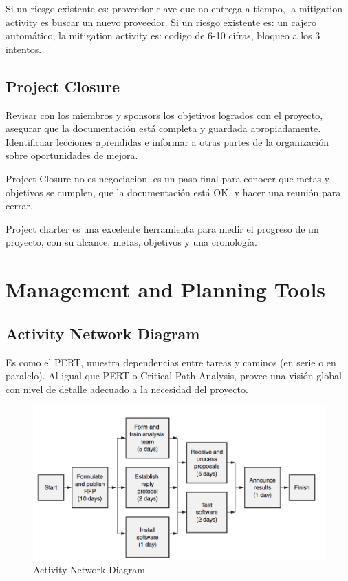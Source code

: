 \documentclass[]{article}
\begin{document}
Si un riesgo existente es: proveedor clave que no entrega a tiempo, la mitigation activity es buscar un nuevo proveedor.
Si un riesgo existente es: un cajero automático, la mitigation activity es: codigo de 6-10 cifras, bloqueo a los 3 intentos.

\subsection{Project Closure}

Revisar con los miembros y sponsors los objetivos logrados con el proyecto, asegurar que la documentación está completa y guardada apropiadamente. Identificaar lecciones aprendidas e informar a otras partes de la organización sobre oportunidades de mejora.

Project Closure no es negociacion, es un paso final para conocer que metas y objetivos se cumplen, que la documentación está OK, y hacer una reunión para cerrar.

Project charter es una excelente herramienta para medir el progreso de un proyecto, con su alcance, metas, objetivos y una cronología.

\section{Management and Planning Tools}

\subsection{Activity Network Diagram}
Es como el PERT, muestra dependencias entre tareas y caminos (en serie o en paralelo). Al igual que PERT o Critical Path Analysis, provee una visión global con nivel de detalle adecuado a la necesidad del proyecto.

\begin{figure}[ht!]
	\centering
	\includegraphics[width=120mm]{imagenes/AND.png}
	\caption{Activity Network Diagram}
	\label{fig:ANDDiagram}
\end{figure}
\end{document}
